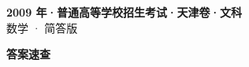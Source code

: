 \documentclass[zihao=-4, a4paper]{ctexart}
\begin{document}
\begin{center}
  {\Large\bfseries 2009 年·普通高等学校招生考试·天津卷·文科}\\[4pt]
  {\large 数学 · 简答版}
\end{center}
\medskip
{}

\clearpage
{}
\begin{center}{\Large\bfseries 答案速查}\end{center}
\medskip

\end{document}
